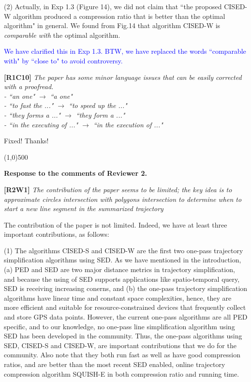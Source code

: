 \documentclass{letter}
\begin{document}
{(2) Actually, in Exp 1.3 (Figure 14), we did not claim that ``the proposed CISED-W algorithm produced a compression ratio that is better than the optimal algorithm" {in general}.
We found from Fig.14 that algorithm CISED-W is \emph{comparable with} the optimal algorithm.

\textcolor{blue}{We have clarified this in Exp 1.3. BTW, we have replaced the words ``comparable with" by ``close to" to avoid controversy.}


\textbf{[R1C10]} \emph{The paper has some minor language issues that can be easily corrected with a proofread.\\
- ``an one" $\rightarrow$ ``a one" \\
- ``to fast the ..." $\rightarrow$ ``to speed up the ..." \\
- ``they forms a ..." $\rightarrow$ ``they form a ..."	\\
- ``in the executing of ..." $\rightarrow$ ``in the execution of ..."
}


Fixed! Thanks!

\line(1,0){500}

\textbf{Response to the comments of Reviewer 2.}

\textbf{[R2W1]} \emph{The contribution of the paper seems to be limited; the key idea is to approximate circles intersection with polygons intersection to determine when to start a new line segment in the summarized trajectory}

The contribution of the paper is not limited. Indeed, we have at least three important contributions, as follows:

(1) The algorithms CISED-S and CISED-W are the first two one-pass trajectory simplification algorithms using SED. As we have mentioned in the introduction, (a) PED and SED are two major distance metrics in trajectory simplification, and because the using of SED supports applications like spatio-temporal query, SED is receiving increasing conerns, and (b) the one-pass trajectory simplification algorithms have linear time and constant space complexities, hence, they are more efficient and suitable for resource-constrained devices that frequently collect and store GPS data points. However, the current one-pass algorithms are all PED specific, and to our knowledge, no one-pass line simplification algorithm using SED has been developed in the community. Thus, the one-pass algorithms using SED, CISED-S and CISED-W, are important contributions that we do for the community. Also note that they both run fast as well as have good compression ratios, and are better than the most recent SED enabled, online trajectory compression algorithm SQUISH-E in both compression ratio and running time.

}
\end{document}
